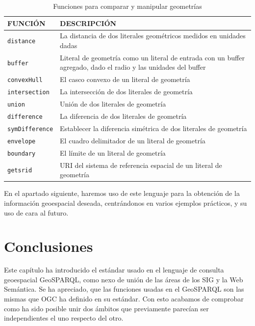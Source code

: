 \begin{table}[H]
	\caption{Funciones para comparar y manipular geometrías}
	\label{funciones-geosparql}
	\centering
	\begin{tabular}{|l|m{8.6cm}|}
		\hline
		\rowcolor[HTML]{EFEFEF} 
		{\textbf{FUNCIÓN} } & {\textbf{DESCRIPCIÓN}} \\ \hline
		\texttt{distance}		&       La distancia de dos literales geométricos medidos en unidades dadas                  \\ \hline
		\texttt{buffer} &           Literal de geometría como un literal de entrada con un buffer agregado, dado el radio y las unidades del buffer              \\ \hline
		\texttt{convexHull}	&      El casco convexo de un literal de geometría                   \\ \hline
		\texttt{intersection} &          La intersección de dos literales de geometría               \\ \hline
		\texttt{union}		&     Unión de dos literales de geometría                    \\ \hline
		\texttt{difference} &       La diferencia de dos literales de geometría                  \\ \hline
		\texttt{symDifference}	&      Establecer la diferencia simétrica de dos literales de geometría                  \\ \hline
		\texttt{envelope}  &              El cuadro delimitador de un literal de geometría           \\ \hline
		\texttt{boundary}		&    El límite de un literal de geometría                     \\ \hline
		\texttt{getsrid} &       URI del sistema de referencia espacial de un literal de geometría                  \\ \hline		
	\end{tabular}
\end{table}

En el apartado siguiente, haremos uso de este lenguaje para la obtención de la información geoespacial deseada, centrándonos en varios ejemplos prácticos, y su uso de cara al futuro.

\section{Conclusiones}

Este capítulo ha introducido el estándar usado en el lenguaje de consulta geoespacial GeoSPARQL, como nexo de unión de las áreas de los SIG y la Web Semántica. Se ha apreciado, que las funciones usadas en el GeoSPARQL son las mismas que OGC ha definido en su estándar. Con esto acabamos de comprobar como ha sido posible unir dos ámbitos que previamente parecían ser independientes el uno respecto del otro.